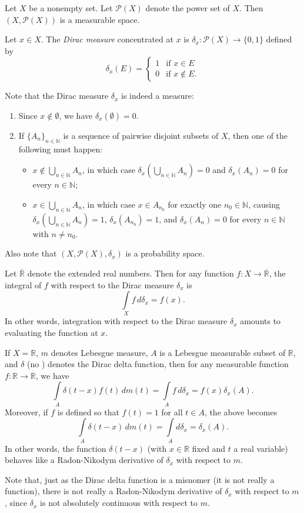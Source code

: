 \documentclass[12pt]{article}
\begin{document}

Let $X$ be a nonempty set.  Let $\mathcal{P}(X)$ denote the power set of $X$.  Then $(X,\mathcal{P}(X))$ is a measurable space.

Let $x\in X$.  The \emph{Dirac measure} concentrated at $x$ is $\delta_x \colon \mathcal{P}(X) \to \{0,1\}$ defined by
\[
\delta_x(E)=\begin{cases}
1 & \text{if } x\in E \\
0 & \text{if } x\notin E. \end{cases}
\]

Note that the Dirac measure $\delta_x$ is indeed a measure:

\begin{enumerate}
\item Since $x \notin \emptyset$, we have $\delta_x(\emptyset)=0$.
\item If $\{A_n\}_{n\in\mathbb{N}}$ is a sequence of pairwise disjoint subsets of $X$, then one of the following must happen:
\begin{itemize}
\item $\displaystyle x \notin \bigcup_{n\in\mathbb{N}} A_n$, in which case $\displaystyle \delta_x\left( \bigcup_{n\in\mathbb{N}} A_n\right)=0$ and $\delta_x(A_n)=0$ for every $n\in\mathbb{N}$;
\item $\displaystyle x \in \bigcup_{n\in\mathbb{N}} A_n$, in which case $x\in A_{n_0}$ for exactly one $n_0\in\mathbb{N}$, causing $\displaystyle \delta_x\left( \bigcup_{n\in\mathbb{N}} A_n\right)=1$, $\delta_x(A_{n_0})=1$, and $\delta_x(A_n)=0$ for every $n\in\mathbb{N}$ with $n\neq n_0$.
\end{itemize}
\end{enumerate}

Also note that $(X,\mathcal{P}(X),\delta_x)$ is a probability space.

Let $\overline{\mathbb{R}}$ denote the extended real numbers.  Then for any function $f \colon X \to \overline{\mathbb{R}}$, the integral of $f$ with respect to the Dirac measure $\delta_x$ is
\[
\int\limits_X f \, d\delta_x =f(x).
\]
In other words, integration with respect to the Dirac measure $\delta_x$ amounts to evaluating the function at $x$.

If $X=\mathbb{R}$, $m$ denotes Lebesgue measure, $A$ is a Lebesgue measurable subset of $\mathbb{R}$, and $\delta$ (no ) denotes the Dirac delta function, then for any measurable function $f \colon \mathbb{R} \to \mathbb{R}$, we have
\[
\int\limits_A \delta(t-x)f(t) \, dm(t)=\int\limits_A f \, d\delta_x=f(x)\delta_x(A).
\]
Moreover, if $f$ is defined so that $f(t)=1$ for all $t\in A$, the above  becomes
\[
\int\limits_A \delta(t-x) \, dm(t)=\int\limits_A d\delta_x=\delta_x(A).
\]
In other words, the function $\delta(t-x)$ (with $x\in\mathbb{R}$ fixed and $t$ a real variable) behaves like a Radon-Nikodym derivative of $\delta_x$ with respect to $m$.  

Note that, just as the Dirac delta function is a misnomer (it is not really a function), there is not really a Radon-Nikodym derivative of $\delta_x$ with respect to $m$, since $\delta_x$ is not absolutely continuous with respect to $m$.
\end{document}
